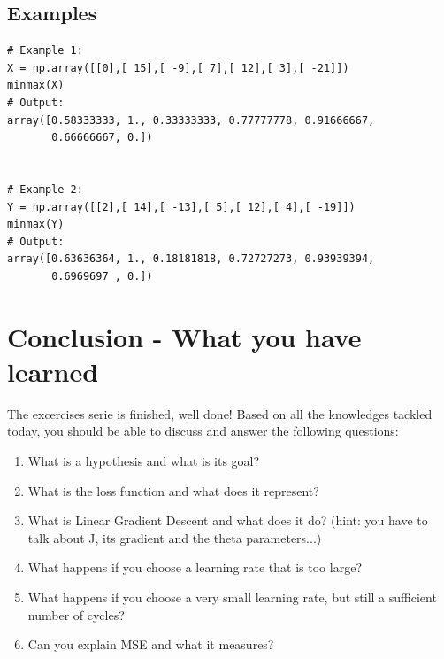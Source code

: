\documentclass{42-en}
\begin{document}
\section*{Examples}
\begin{verbatim}
# Example 1:
X = np.array([[0],[ 15],[ -9],[ 7],[ 12],[ 3],[ -21]])
minmax(X)
# Output:
array([0.58333333, 1., 0.33333333, 0.77777778, 0.91666667,
       0.66666667, 0.])


# Example 2:
Y = np.array([[2],[ 14],[ -13],[ 5],[ 12],[ 4],[ -19]])
minmax(Y)
# Output:
array([0.63636364, 1., 0.18181818, 0.72727273, 0.93939394,
       0.6969697 , 0.])
\end{verbatim}


\newpage

\chapter{Conclusion - What you have learned}

The excercises serie is finished, well done!
Based on all the knowledges tackled today, you should be able to discuss and answer the following questions:

\begin{enumerate}
  \item What is a hypothesis and what is its goal?  
  \item What is the loss function and what does it represent?   
  \item What is Linear Gradient Descent and what does it do?  
  (hint: you have to talk about J, its gradient and the theta parameters...)  
  \item What happens if you choose a learning rate that is too large?
  \item What happens if you choose a very small learning rate, but still a sufficient number of cycles?
  \item Can you explain MSE and what it measures?
\end{enumerate}


\end{document}
